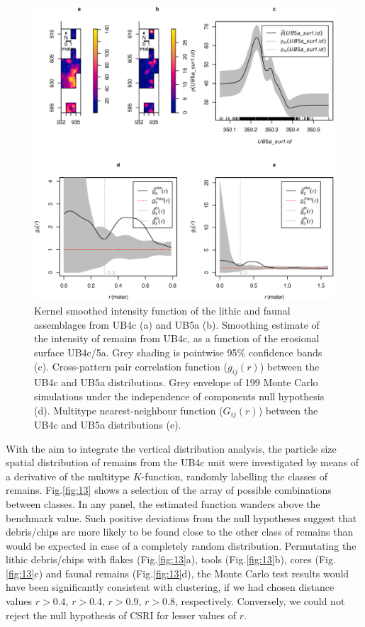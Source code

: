 \documentclass[preprint,authoryear,times]{elsarticle} %
\begin{document}
\begin{figure}[]
  \centering
  \includegraphics[width=1\textwidth]{../artwork/Fig12.eps}
  \caption{Kernel smoothed intensity function of the lithic and faunal assemblages from UB4c (a) and UB5a (b). Smoothing estimate of the intensity of remains from UB4c, as a function of the erosional surface UB4c/5a. Grey shading is pointwise 95\% confidence bands (c). Cross-pattern pair correlation function ($g_{ij}(r)$) between the UB4c and UB5a distributions. Grey envelope of 199 Monte Carlo simulations under the independence of components null hypothesis (d). Multitype nearest-neighbour function ($G_{ij}(r)$) between the UB4c and UB5a distributions (e).}
  \label{fig:12}
\end{figure}

With the aim to integrate the vertical distribution analysis, the particle size spatial distribution of remains from the UB4c unit were investigated by means of a derivative of the multitype $K$-function, randomly labelling the classes of remains. Fig.\ref{fig:13} shows a selection of the array of possible combinations between classes. In any panel, the estimated function wanders above the benchmark value. Such positive deviations from the null hypotheses suggest that debris/chips are more likely to be found close to the other class of remains than would be expected in case of a completely random distribution. Permutating the lithic debris/chips with flakes (Fig.\ref{fig:13}a), tools (Fig.\ref{fig:13}b), cores (Fig.\ref{fig:13}c) and faunal remains (Fig.\ref{fig:13}d), the Monte Carlo test results would have been significantly consistent with clustering, if we had chosen distance values $r > 0.4$, $r > 0.4$, $r > 0.9$, $r > 0.8$, respectively. Conversely, we could not reject the null hypothesis of CSRI for lesser values of $r$.
\end{document}
